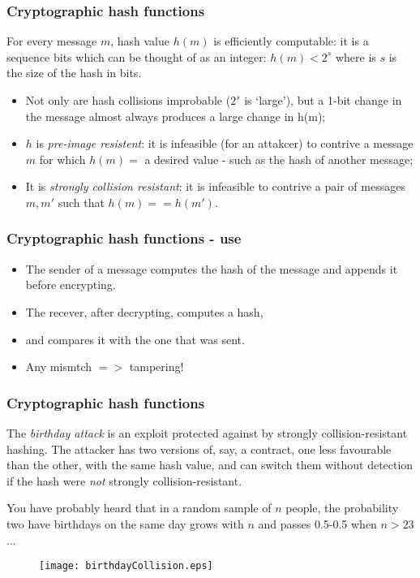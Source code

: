 \documentclass[10pt, hyperref={pdfpagelabels=false}]{beamer}
\begin{document}
\begin{frame}
\frametitle{Cryptographic hash functions}
\begin{center}
\end{center}

For every message $m$, hash value $h(m)$ is efficiently computable: it is a sequence bits which can be thought of as an integer: $h(m) < 2^s$ where is $s$ is the size of the hash in bits.
\begin{itemize}
\item Not only are hash collisions improbable ($2^s$ is `large'), but a 1-bit change in the message almost always produces a large change in h(m);
\item $h$ is \emph{\color{blue}pre-image resistent}: it is infeasible (for an attakcer) to contrive a message $m$ for which $h(m) =$ a desired value - such as the hash of another message;
\item It is \emph{\color{blue}strongly collision resistant}: it is infeasible to contrive a pair of messages $m, m'$ such that $h(m) == h(m')$.
\end{itemize}
\end{frame}

\begin{frame}
\frametitle{Cryptographic hash functions - use}
\begin{itemize}
\item The sender of a message computes the hash of the message and appends it before encrypting.
\item The recever, after decrypting, computes a hash,
\item and compares it with the one that was sent.
\item Any mismtch $=>$ tampering!
\end{itemize}
\end{frame}

\begin{frame}
\frametitle{Cryptographic hash functions}
\small
The \emph{\color{blue}birthday attack} is an exploit protected against by strongly collision-resistant hashing. The attacker has two versions of, say, a contract, one less favourable than the other, with the same hash value, and can switch them without detection if the hash were \emph{not} strongly collision-resistant.

You have probably heard that in a random sample of $n$ people, the probability two have birthdays on the same day grows with $n$ and passes 0.5-0.5 when $n>23$...

\begin{figure}
\texttt{[image: birthdayCollision.eps]}
\end{figure}
\end{frame}
\end{document}
